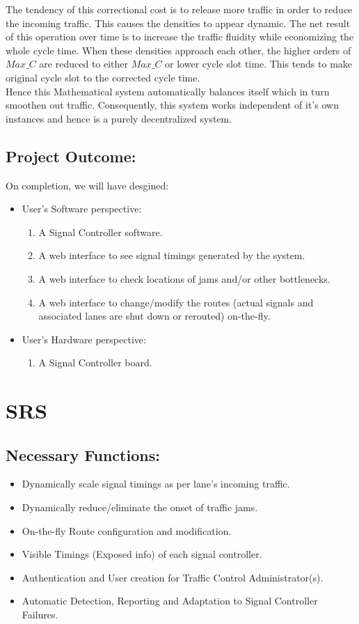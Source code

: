 \documentclass[12pt,a4paper,final]{report}
\begin{document}
\newpage
	The tendency of this correctional cost is to release more traffic in order to reduce the incoming traffic. This causes the densities to appear dynamic. The net result of this operation over time is to increase the traffic fluidity while economizing the whole cycle time. When these densities approach each other, the higher orders of $Max\_C$ are reduced to either $Max\_C$ or lower cycle slot time. This tends to make original cycle slot to the corrected cycle time.\\
			
	Hence this Mathematical system automatically balances itself which in turn smoothen out traffic. Consequently, this system works independent of it's own instances and hence is a purely decentralized system.

\subsection{Project Outcome:}
	On completion, we will have desgined:
	\begin{itemize}
		\item User's Software perspective:	
		\begin{enumerate}
			\item A Signal Controller software.
			\item A web interface to see signal timings generated by the system.
			\item A web interface to check locations of jams and/or other bottlenecks.
			\item A web interface to change/modify the routes (actual signals and associated lanes are shut down or rerouted) on-the-fly.
		\end{enumerate}
		
		\item User's Hardware perspective:
		\begin{enumerate}
			\item A Signal Controller board.
		\end{enumerate}
	\end{itemize}
\section{SRS}

\subsection{Necessary Functions:}
\begin{itemize}
	\item Dynamically scale signal timings as per lane's incoming traffic.
	\item Dynamically reduce/eliminate the onset of traffic jams.
	\item On-the-fly Route configuration and modification.
	\item Visible Timings (Exposed info) of each signal controller.
	\item Authentication and User creation for Traffic Control Administrator(s).
	\item Automatic Detection, Reporting and Adaptation to Signal Controller Failures.
\end{itemize}
\end{document}
